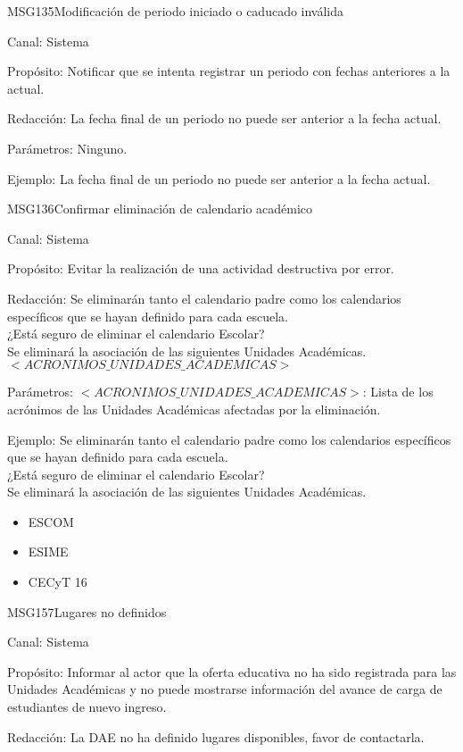 \begin{mensaje}{MSG135}{Modificación de periodo iniciado o caducado inválida}
	\item[Canal:] Sistema
	\item[Propósito:] Notificar que se intenta registrar un periodo con fechas anteriores a la actual.
	\item[Redacción:] La fecha final de un periodo no puede ser anterior a la fecha actual.
	\item[Parámetros:] Ninguno.
	\item[Ejemplo:] La fecha final de un periodo no puede ser anterior a la fecha actual.
\end{mensaje}	

\begin{mensaje}{MSG136}{Confirmar eliminación de calendario académico}
	\item[Canal:] Sistema
	\item[Propósito:] Evitar la realización de una actividad destructiva por error.
	\item[Redacción:]\cdtEmpty
	 Se eliminarán tanto el calendario padre como los calendarios específicos que se hayan definido para cada escuela.\\
¿Está seguro de eliminar el calendario Escolar?\\
Se eliminará la asociación de las siguientes Unidades Académicas.
$<ACRONIMOS\_UNIDADES\_ACADEMICAS>$
	\item[Parámetros:] $<ACRONIMOS\_UNIDADES\_ACADEMICAS>$: Lista de los acrónimos de las Unidades Académicas afectadas por la eliminación.
	\item[Ejemplo:] \cdtEmpty
	 Se eliminarán tanto el calendario padre como los calendarios específicos que se hayan definido para cada escuela.\\
¿Está seguro de eliminar el calendario Escolar?\\
Se eliminará la asociación de las siguientes Unidades Académicas.
        \begin{itemize}
			\item ESCOM
			\item ESIME
			\item CECyT 16
        \end{itemize}
\end{mensaje}	

\begin{mensaje}{MSG157}{Lugares no definidos}
	\item[Canal:] Sistema
	\item[Propósito:] Informar al actor que la oferta educativa no ha sido registrada para las Unidades Académicas y no puede mostrarse información del avance de carga de estudiantes de nuevo ingreso.
	\item[Redacción:] La DAE no ha definido lugares disponibles, favor de contactarla.
\end{mensaje}	

